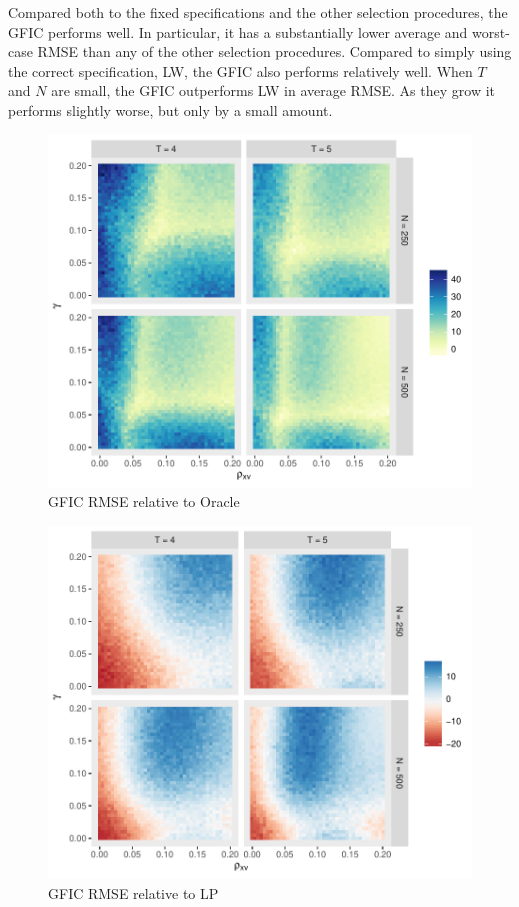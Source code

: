 Compared both to the fixed specifications and the other selection procedures, the GFIC performs well. 
In particular, it has a substantially lower average and worst-case RMSE than any of the other selection procedures.
Compared to simply using the correct specification, LW, the GFIC also performs relatively well. 
When $T$ and $N$ are small, the GFIC outperforms LW in average RMSE. 
As they grow it performs slightly worse, but only by a small amount.
\begin{figure}
\centering
\includegraphics[scale = 0.8]{./simulations/DynamicPanel/results/Dpanel_GFIC_RMSE_rel_oracle}
\caption{GFIC RMSE relative to Oracle}
\end{figure}
\begin{figure}
\centering
\includegraphics[scale = 0.8]{./simulations/DynamicPanel/results/Dpanel_GFIC_RMSE_rel_LP}
\caption{GFIC RMSE relative to LP}
\end{figure}
